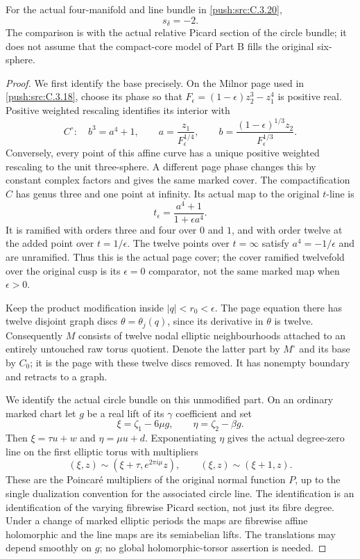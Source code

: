 \begin{proposition}\label{push:src:C.3.21}
For the actual four-manifold and line bundle in \ref{push:src:C.3.20},
\[
 s_\delta=-2.
\]
The comparison is with the actual relative Picard section of
the circle bundle; it does not assume that the compact-core
model of Part B fills the original six-sphere.
\end{proposition}
\begin{proof}
We first identify the base precisely. On the Milnor page used in
\ref{push:src:C.3.18}, choose its phase so that
$F_\epsilon=(1-\epsilon)z_2^3-z_1^4$ is positive real.
Positive weighted rescaling identifies its interior with
\[
 C^\circ:\quad b^3=a^4+1,
 \qquad
 a=\frac{z_1}{F_\epsilon^{1/4}},\qquad
 b=\frac{(1-\epsilon)^{1/3}z_2}{F_\epsilon^{1/3}}.
\]
Conversely, every point of this affine curve has a unique
positive weighted rescaling to the unit three-sphere. A different
page phase changes this by constant complex factors and gives
the same marked cover. The compactification $C$ has genus three
and one point at infinity. Its actual map to the original
$t$-line is
\[
 t_\epsilon=\frac{a^4+1}{1+\epsilon a^4}.
\]
It is ramified with orders three and four over $0$ and $1$,
and with order twelve at the added point over $t=1/\epsilon$.
The twelve points over $t=\infty$ satisfy
$a^4=-1/\epsilon$ and are unramified. Thus this is the
actual page cover; the cover ramified twelvefold over the
original cusp is its $\epsilon=0$ comparator, not the same
marked map when $\epsilon>0$.

Keep the product modification inside $|q|<r_0<\epsilon$.
The page equation there has twelve disjoint graph discs
$\theta=\theta_j(q)$, since its derivative in $\theta$ is
twelve. Consequently $M$ consists of twelve nodal elliptic
neighbourhoods attached to an entirely untouched raw torus
quotient. Denote the latter part by $M^\circ$ and its base by
$C_0$; it is the page with these twelve discs removed. It has
nonempty boundary and retracts to a graph.

We identify the actual circle bundle on this unmodified part.
On an ordinary marked chart let $g$ be a real lift of its
$\gamma$ coefficient and set
\[
 \xi=\zeta_1-6\mu g,\qquad
 \eta=\zeta_2-\beta g.
\]
Then $\xi=\tau u+w$ and $\eta=\mu u+d$. Exponentiating
$\eta$ gives the actual degree-zero line on the first elliptic
torus with multipliers
\[
 (\xi,z)\sim(\xi+\tau,e^{2\pi i\mu}z),\qquad
 (\xi,z)\sim(\xi+1,z).
\]
These are the Poincar\'e multipliers of the original normal
function $P$, up to the single dualization convention for the
associated circle line. The identification is an identification
of the varying fibrewise Picard section, not just its fibre
degree. Under a change of marked elliptic periods the maps are
fibrewise affine holomorphic and the line maps are its
semiabelian lifts. The translations may depend smoothly on
$g$; no global holomorphic-torsor assertion is needed.


\end{proof}
